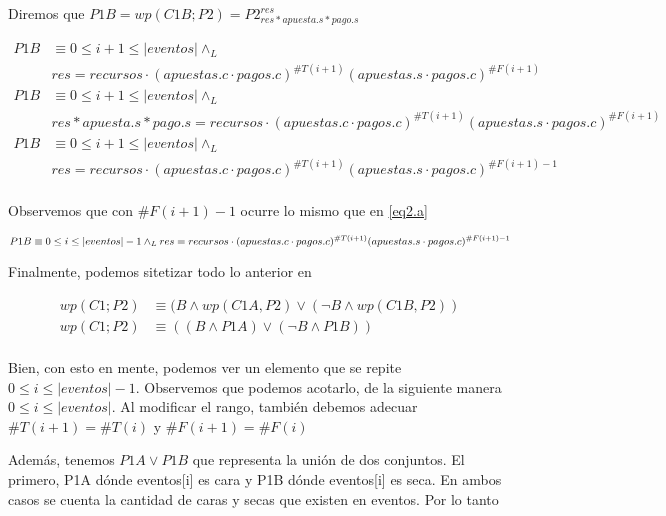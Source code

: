\documentclass[document.tex]{subfiles}
\begin{document}
Diremos que $P1B = wp(C1B;P2) = P2^{res}_{res * apuesta.s * pago.s}$

\begin{equation} \label{eq2.b}
\begin{split}
P1B & \equiv 0\leq i+1 \leq |eventos| \land_L \\& res = recursos \cdot (apuestas.c\cdot pagos.c)^{\#T(i+1)}(apuestas.s\cdot pagos.c)^{\#F(i+1)}\\
P1B & \equiv 0\leq i+1 \leq |eventos| \land_L \\& res * apuesta.s * pago.s = recursos \cdot (apuestas.c\cdot pagos.c)^{\#T(i+1)}(apuestas.s\cdot pagos.c)^{\#F(i+1)}\\
P1B & \equiv 0\leq i+1 \leq |eventos| \land_L \\& res = recursos \cdot (apuestas.c\cdot pagos.c)^{\#T(i+1)}(apuestas.s\cdot pagos.c)^{\#F(i+1)-1}\\
\end{split}
\end{equation}

Observemos que con $\#F(i+1)-1$ ocurre lo mismo que en \ref{eq2.a}

\begin{equation} \label{P1A}
    P1B \equiv 0\leq i \leq |eventos|-1 \land_L \\ res = recursos \cdot (apuestas.c\cdot pagos.c)^{\#T(i+1)}(apuestas.s\cdot pagos.c)^{\#F(i+1)-1}\\
\end{equation}

Finalmente, podemos sitetizar todo lo anterior en

\begin{equation} \label{final}
\begin{split}
    wp(C1;P2) &\equiv (B \land wp(C1A, P2) \lor (\neg B \land wp(C1B, P2))\\
    wp(C1;P2) &\equiv ((B \land P1A) \lor (\neg B \land P1B))\\
\end{split}
\end{equation}

Bien, con esto en mente, podemos ver un elemento que se repite \\$0\leq i \leq |eventos|-1$. Observemos que podemos acotarlo, de la siguiente manera\\
$0\leq i \leq |eventos|$. Al modificar el rango, también debemos adecuar $\#T(i+1)=\#T(i)$ y $\#F(i+1)=\#F(i)$

Además, tenemos $P1A \lor P1B$ que representa la unión de dos conjuntos. El primero, P1A dónde eventos[i] es cara y P1B dónde eventos[i] es seca. En ambos casos se cuenta la cantidad de caras y secas que existen en eventos. Por lo tanto
\end{document}
